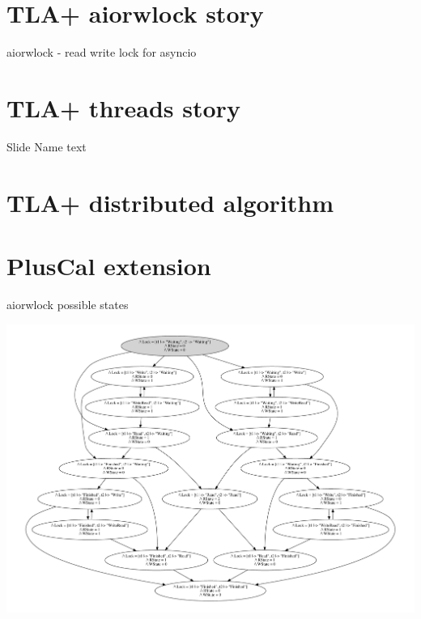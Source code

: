 \documentclass[12pt]{beamer}
\begin{document}
  \section{TLA+ aiorwlock story}
  \begin{frame}{aiorwlock - read write lock for asyncio}
  \end{frame}
  \section{TLA+ threads story}
  \begin{frame}{Slide Name}
      text
  \end{frame}
  \section{TLA+ distributed algorithm}
  \section{PlusCal extension}
  \begin{frame}{aiorwlock possible states}
      \begin{center}
          \includegraphics[scale=0.35,angle=90]{figures/aiorwlock_model}
      \end{center}
  \end{frame}
\end{document}
